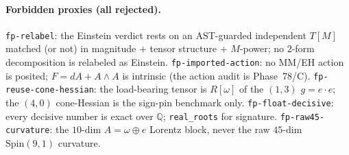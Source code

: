 \documentclass[11pt]{article}
\newcommand{\Q}{\mathbb{Q}}
\newcommand{\eu}{e}
\newcommand{\om}{\omega}
\theoremstyle{definition}\newtheorem{remark}{Remark}
\theoremstyle{plain}\newtheorem{proposition}{Proposition}
\begin{document}
\paragraph{Forbidden proxies (all rejected).}
\texttt{fp-relabel}: the Einstein verdict rests on an AST-guarded independent $T[M]$ matched (or not) in
magnitude $+$ tensor structure $+$ $M$-power; no $2$-form decomposition is relabeled as Einstein.
\texttt{fp-imported-action}: no MM/EH action is posited; $F=dA+A\wedge A$ is intrinsic (the action audit
is Phase~78/C). \texttt{fp-reuse-cone-hessian}: the load-bearing tensor is $R[\om]$ of the $(1,3)$
$g=\eu\cdot\eu$; the $(4,0)$ cone-Hessian is the sign-pin benchmark only. \texttt{fp-float-decisive}:
every decisive number is exact over $\Q$; \texttt{real\_roots} for signature. \texttt{fp-raw45-curvature}:
the $10$-dim $A=\om\oplus \eu$ Lorentz block, never the raw $45$-dim $\mathrm{Spin}(9,1)$ curvature.
\end{document}
